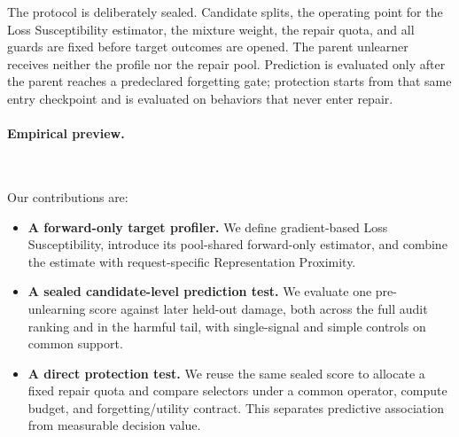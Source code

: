The protocol is deliberately sealed. Candidate splits, the operating point for
the Loss Susceptibility estimator, the mixture weight, the repair
quota, and all guards are fixed
before target outcomes are opened. The parent unlearner receives neither the
profile nor the repair pool. Prediction is evaluated only after the parent
reaches a predeclared forgetting gate; protection starts from that same entry
checkpoint and is evaluated on behaviors that never enter repair.

\paragraph{Empirical preview.}
{\setlength{\emergencystretch}{3em}
\PredictionHeadline\ \TailHeadline\ \FidelityHeadline\
\ProtectionHeadline\ \TransferHeadline\par}

Our contributions are:
\begin{itemize}
    \item \textbf{A forward-only target profiler.} We define gradient-based
    Loss Susceptibility, introduce its pool-shared forward-only estimator, and
    combine the estimate with request-specific Representation Proximity.
    \item \textbf{A sealed candidate-level prediction test.} We evaluate one
    pre-unlearning score against later held-out damage, both across the full
    audit ranking and in the harmful tail, with single-signal and simple
    controls on common support.
    \item \textbf{A direct protection test.} We reuse the same sealed score to
    allocate a fixed repair quota and compare selectors under a common
    operator, compute budget, and forgetting/utility contract. This separates
    predictive association from measurable decision value.
\end{itemize}
